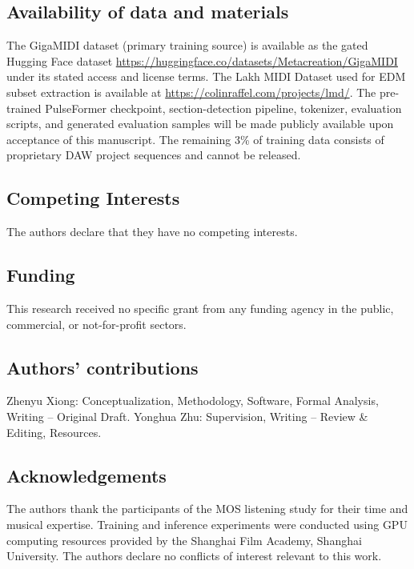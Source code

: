 \documentclass[pdflatex,sn-mathphys-num,twocolumn]{sn-jnl}
\theoremstyle{thmstyleone}
\theoremstyle{thmstyletwo}
\begin{document}
\subsection*{Availability of data and materials}
The GigaMIDI dataset (primary training source) is available as the gated Hugging Face dataset \url{https://huggingface.co/datasets/Metacreation/GigaMIDI} under its stated access and license terms.
The Lakh MIDI Dataset used for EDM subset extraction is available at \url{https://colinraffel.com/projects/lmd/}.
The pre-trained PulseFormer checkpoint, section-detection pipeline, tokenizer, evaluation scripts, and generated evaluation samples will be made publicly available upon acceptance of this manuscript.
The remaining 3\% of training data consists of proprietary DAW project sequences and cannot be released.

\subsection*{Competing Interests}
The authors declare that they have no competing interests.

\subsection*{Funding}
This research received no specific grant from any funding agency in the public, commercial, or not-for-profit sectors.

\subsection*{Authors' contributions}
Zhenyu Xiong: Conceptualization, Methodology, Software, Formal Analysis, Writing -- Original Draft.
Yonghua Zhu: Supervision, Writing -- Review \& Editing, Resources.

\subsection*{Acknowledgements}
The authors thank the participants of the MOS listening study for their time and musical expertise.
Training and inference experiments were conducted using GPU computing resources provided by the Shanghai Film Academy, Shanghai University.
The authors declare no conflicts of interest relevant to this work.



\end{document}
